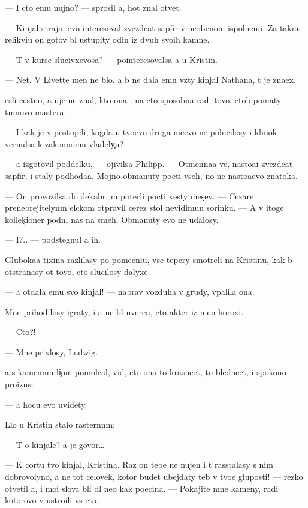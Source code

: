\documentclass[10pt]{book}
\begin{document}
— I cto {\y}emu nujno? — sprosil {\y}a, hot{\ia} znal otvet.

— Kinjal straja. {\Y}evo interesoval zvezdcat{\yi}{\y} sapfir v neob{\yi}cnom ispolneni{\y}i. Za taku{\y}u relikvi{\y}u on gotov b{\yi}l ustupity odin iz dvuh svo{\y}ih kamne{\y}.

— T{\yi} v kurse slucivxevosa? — pointeresovalsa {\y}a u Kristin{\yi}.

— Net. V Livette men{\ia} ne b{\yi}lo. {\Y}a b{\yi} ne dala {\y}emu vz{\ia}ty kinjal Nathana, t{\yi} je zna{\y}ex.

{\Y}esli cestno, {\y}a uje ne znal, kto ona i na cto sposobna radi tovo, ctob{\yi} po{\y}maty t{\e}mnovo mastera.

— I kak je v{\yi} postupili, kogda u tvo{\y}evo druga nicevo ne polucilosy i klinok vernulsa k zakonnomu vladely{\c}u?

— {\Y}a izgotovil poddelku, — ojivilsa Philipp. — Otmenna{\y}a ve{\x}, nasto{\y}a{\x}i{\y} zvezdcat{\yi}{\y} sapfir, i staly podhod{\ia}{\x}a{\y}a. Mojno obmanuty pocti vseh, no ne nasto{\y}a{\x}evo znatoka.

— On provozilsa do dekabr{\ia}, m{\yi} poter{\ia}li pocti xesty mes{\ia}{\c}ev. — Cezare prenebrejitelyn{\yi}m {\x}elckom otpravil cerez stol nevidimu{\y}u sorinku. — A v itoge kollek{\c}ioner podn{\ia}l nas na smeh. Obmanuty {\y}evo ne udalosy.

— I?.. — podstegnul {\y}a ih.

Gluboka{\y}a tixina razlilasy po pome{\x}eni{\y}u, vse tepery smotreli na Kristinu, kak b{\yi} otstran{\ia}{\y}asy ot tovo, cto slucilosy dalyxe.

— {\Y}a otdala {\y}emu svo{\y} kinjal! — nabrav vozduha v grudy, v{\yi}palila ona.

Mne prihodilosy igraty, i {\y}a ne b{\yi}l uveren, cto akter iz men{\ia} horoxi{\y}.

— Cto?!

— Mne prixlosy, Ludwig.

{\Y}a s kamenn{\yi}m li{\c}om pomolcal, vid{\ia}, cto ona to krasne{\y}et, to bledne{\y}et, i spoko{\y}no proizn{\e}s:

— {\Y}a hocu {\y}evo uvidety.

Li{\c}o u Kristin{\yi} stalo raster{\ia}nn{\yi}m:

— T{\yi} o kinjale? {\Y}a je govor{\iu}…

— K cortu tvo{\y} kinjal, Kristina. Raz on tebe ne nujen i t{\yi} rasstalasy s nim dobrovolyno, {\y}a ne tot celovek, kotor{\yi}{\y} budet ubejdaty teb{\ia} v tvo{\y}e{\y} gluposti! — rezko otvetil {\y}a, i mo{\y}i slova b{\yi}li dl{\ia} ne{\y}o kak po{\x}ecina. — Pokajite mne kameny, radi kotorovo v{\yi} ustro{\y}ili vs{\e} eto.
\end{document}
